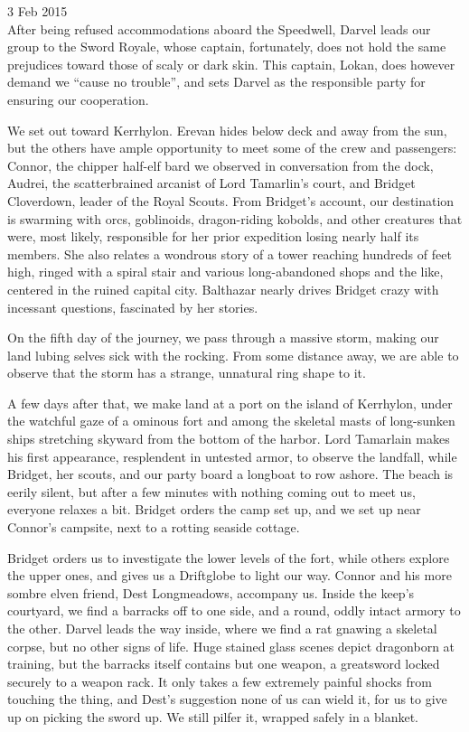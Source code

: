 \documentclass[letterpaper]{article}
\begin{document}
3 Feb 2015\\
After being refused accommodations aboard the Speedwell, Darvel leads our group to the Sword Royale, whose captain, fortunately, does not hold the same prejudices toward those of scaly or dark skin. This captain, Lokan, does however demand we ``cause no trouble'', and sets Darvel as the responsible party for ensuring our cooperation.

We set out toward Kerrhylon. Erevan hides below deck and away from the sun, but the others have ample opportunity to meet some of the crew and passengers: Connor, the chipper half-elf bard we observed in conversation from the dock, Audrei, the scatterbrained arcanist of Lord Tamarlin's court, and Bridget Cloverdown, leader of the Royal Scouts. From Bridget's account, our destination is swarming with orcs, goblinoids, dragon-riding kobolds, and other creatures that were, most likely, responsible for her prior expedition losing nearly half its members. She also relates a wondrous story of a tower reaching hundreds of feet high, ringed with a spiral stair and various long-abandoned shops and the like, centered in the ruined capital city. Balthazar nearly drives Bridget crazy with incessant questions, fascinated by her stories.

On the fifth day of the journey, we pass through a massive storm, making our land lubing selves sick with the rocking. From some distance away, we are able to observe that the storm has a strange, unnatural ring shape to it.

A few days after that, we make land at a port on the island of Kerrhylon, under the watchful gaze of a ominous fort and among the skeletal masts of long-sunken ships stretching skyward from the bottom of the harbor. Lord Tamarlain makes his first appearance, resplendent in untested armor, to observe the landfall, while Bridget, her scouts, and our party board a longboat to row ashore. The beach is eerily silent, but after a few minutes with nothing coming out to meet us, everyone relaxes a bit. Bridget orders the camp set up, and we set up near Connor's campsite, next to a rotting seaside cottage.

Bridget orders us to investigate the lower levels of the fort, while others explore the upper ones, and gives us a Driftglobe to light our way. Connor and his more sombre elven friend, Dest Longmeadows, accompany us. Inside the keep's courtyard, we find a barracks off to one side, and a round, oddly intact armory to the other. Darvel leads the way inside, where we find a rat gnawing a skeletal corpse, but no other signs of life. Huge stained glass scenes depict dragonborn at training, but the barracks itself contains but one weapon, a greatsword locked securely to a weapon rack. It only takes a few extremely painful shocks from touching the thing, and Dest's suggestion none of us can wield it, for us to give up on picking the sword up. We still pilfer it, wrapped safely in a blanket.
\end{document}
